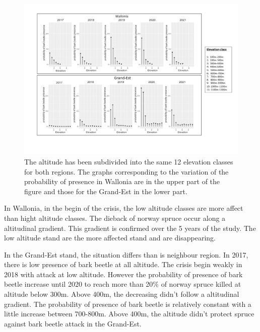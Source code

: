 \documentclass[3p,procedia]{elsarticle}
\begin{document}
\begin{figure}
\centering
	\includegraphics[width=\textwidth]{graphe_wall_GDE.png}
     \caption{The altitude has been subdivided into the same 12 elevation classes for both regions. 
The graphs corresponding to the variation of the probability of presence in Wallonia are in the upper part of the figure and those for the Grand-Est in the lower part.
}
	\label{alti_sco}
\end{figure}

In Wallonia, in the begin of the crisis, the low altitude classes are more affect than hight altitude classes.
The dieback of norway spruce occur along a altitudinal  gradient.
This gradient is confirmed over the 5 years of the study.
The low altitude stand are the more affected stand and are disappearing.
 

In the Grand-Est stand, the situation differs than is neighbour region. In 2017, there is low presence of bark beetle  at all altitude.
The crisis begin weakly in 2018 with attack at low altitude.
However the probability of presence of bark beetle increase until 2020 to reach more than 20\% of norway spruce killed at altitude below 300m.
Above 400m, the decreasing didn't follow a altitudinal gradient.
The probability of presence of bark beetle is relatively constant with a little increase between 700-800m.
Above 400m, the altitude didn't protect spruce against bark beetle attack in the Grand-Est.
\end{document}
